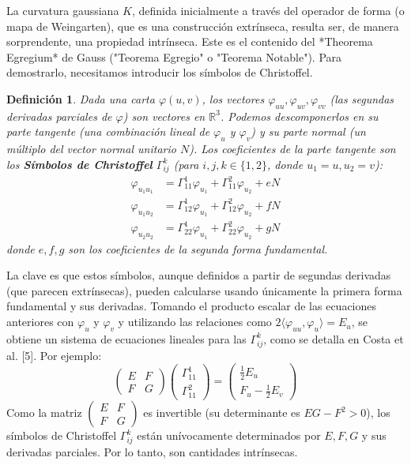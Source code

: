 \documentclass[12pt, a4paper]{report}
\theoremstyle{miestilo}
\theoremstyle{midefinicion}
\newtheorem{definicion}[teorema]{Definición}
\begin{document}
La curvatura gaussiana $K$, definida inicialmente a través del operador de forma (o mapa de Weingarten), que es una construcción extrínseca, resulta ser, de manera sorprendente, una propiedad intrínseca. Este es el contenido del *Theorema Egregium* de Gauss ("Teorema Egregio" o "Teorema Notable"). Para demostrarlo, necesitamos introducir los símbolos de Christoffel.

\begin{definicion}
Dada una carta $\varphi(u,v)$, los vectores $\varphi_{uu}, \varphi_{uv}, \varphi_{vv}$ (las segundas derivadas parciales de $\varphi$) son vectores en $\mathbb{R}^3$. Podemos descomponerlos en su parte tangente (una combinación lineal de $\varphi_u$ y $\varphi_v$) y su parte normal (un múltiplo del vector normal unitario $N$). Los coeficientes de la parte tangente son los \textbf{Símbolos de Christoffel} $\Gamma_{ij}^k$ (para $i,j,k \in \{1,2\}$, donde $u_1=u, u_2=v$):
\begin{align*}
\varphi_{u_1 u_1} &= \Gamma_{11}^1 \varphi_{u_1} + \Gamma_{11}^2 \varphi_{u_2} + e N \\
\varphi_{u_1 u_2} &= \Gamma_{12}^1 \varphi_{u_1} + \Gamma_{12}^2 \varphi_{u_2} + f N \\
\varphi_{u_2 u_2} &= \Gamma_{22}^1 \varphi_{u_1} + \Gamma_{22}^2 \varphi_{u_2} + g N
\end{align*}
donde $e, f, g$ son los coeficientes de la segunda forma fundamental.
\end{definicion}

La clave es que estos símbolos, aunque definidos a partir de segundas derivadas (que parecen extrínsecas), pueden calcularse usando únicamente la primera forma fundamental y sus derivadas. Tomando el producto escalar de las ecuaciones anteriores con $\varphi_u$ y $\varphi_v$ y utilizando las relaciones como $2\langle \varphi_{uu}, \varphi_u \rangle = E_u$, se obtiene un sistema de ecuaciones lineales para las $\Gamma_{ij}^k$, como se detalla en Costa et al. [5]. Por ejemplo:
$$ \begin{pmatrix} E & F \\ F & G \end{pmatrix} \begin{pmatrix} \Gamma_{11}^1 \\ \Gamma_{11}^2 \end{pmatrix} = \begin{pmatrix} \frac{1}{2}E_u \\ F_u - \frac{1}{2}E_v \end{pmatrix} $$
Como la matriz $\begin{pmatrix} E & F \\ F & G \end{pmatrix}$ es invertible (su determinante es $EG-F^2 > 0$), los símbolos de Christoffel $\Gamma_{ij}^k$ están unívocamente determinados por $E, F, G$ y sus derivadas parciales. Por lo tanto, son cantidades intrínsecas.
\end{document}
